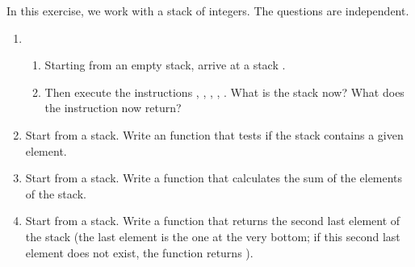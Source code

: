 \documentclass[11pt,class=report,crop=false]{standalone}
\begin{document}
\begin{activite}


In this exercise, we work with a stack of integers. The questions are independent.

\begin{enumerate}
  \item 
  \begin{enumerate}
    \item Starting from an empty stack, arrive at a stack \ci{[5,7,2,4]}.
    \item Then execute the instructions , , , , . What is the stack now? What does the instruction   now return?
\end{enumerate}  

  \item Start from a stack. Write an  function that tests if the stack contains a given element.
  
  \item Start from a stack. Write a function that calculates the sum of the elements of the stack. 
  
  \item Start from a stack. Write a function that returns the second last element of the stack (the last element is the one at the very bottom; if this second last element does not exist, the function returns ). 
  
\end{enumerate} 
\end{activite}

\medskip
\end{document}
